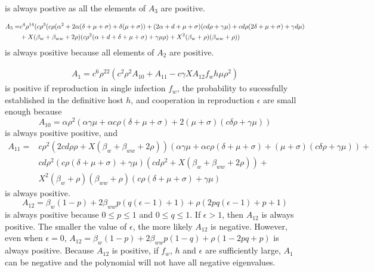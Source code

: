 \documentclass[11pt]{article}
\begin{document}
is always postive as all the elements of $A_3$ are positive.

\begin{align}
	A_3 = & c^4 \rho^{14} (c \rho ^3 (c \rho  (\alpha ^2+2 \alpha  (\delta +\mu +\sigma )+\delta  (\mu +\sigma ))+(2 \alpha +d+\mu +\sigma ) (c d \rho +\gamma  \mu )+c d \rho  (2 \delta +\mu +\sigma )+\gamma  d \mu ) \notag \\
	&+X (\beta_w + \beta_{ww}+2 \rho ) (c \rho ^2 (\alpha +d+\delta +\mu +\sigma )+\gamma  \mu  \rho )+X^2 (\beta_w+\rho ) (\beta_{ww}+\rho ))
\end{align}
is always positive because all elements of $A_2$ are positive.

\begin{align}
	A_1 = c^6 \rho ^{22} (c^2 \rho ^2 A_{10} +A_{11}-c \gamma  X  A_{12} f_w h \mu  \rho ^2)
\end{align}
is positive if reproduction in single infection $f_w$, the probability to sucessfully established in the definitive host $h$, and cooperation in reproduction $\epsilon$ are small enough because 
\begin{equation}
	A_{10} = \alpha  \rho ^2 (\alpha  \gamma  \mu +\alpha  c \rho  (\delta +\mu +\sigma )+2 (\mu +\sigma ) (c \delta  \rho +\gamma  \mu ))
\end{equation}
is always positive positive, and
\begin{align}
	A_{11} = & c \rho ^2 (2 c d \rho  \rho + X (\beta_w + \beta_{ww}+2 \rho )) (\alpha  \gamma  \mu +\alpha  c \rho  (\delta +\mu +\sigma ) +  (\mu +\sigma ) (c \delta  \rho +\gamma  \mu )) + \\
	& c d \rho ^2 (c \rho  (\delta +\mu +\sigma )+\gamma  \mu ) (c d \rho ^2+X (\beta_w+\beta_{ww}+2 \rho )) + \\
	& X^2 (\beta_w+\rho ) (\beta_{ww}+\rho ) (c \rho  (\delta +\mu +\sigma )+\gamma  \mu )
\end{align}
is always positive.
\begin{equation}
	A_{12} = \beta_w (1-p)+2 \beta_{ww} p (q (\epsilon -1)+1)+\rho  (2 p q (\epsilon -1)+p+1)
\end{equation}
is always positive because $0 \leq p \leq 1$ and $0 \leq q \leq 1$. If $\epsilon > 1$, then $A_{12}$ is always positive. The smaller the value of $\epsilon$, the more likely $A_{12}$ is negative. However, even when $\epsilon = 0$, $A_{12} =  \beta_w (1-p)+2 \beta_{ww} p (1- q)+\rho  (1 - 2 p q + p)$ is always positive.
Because $A_{12}$ is positive, if $f_w$, $h$ and $\epsilon$ are sufficiently large, $A_1$ can be negative and the polynomial will not have all negative eigenvalues.
\end{document}
